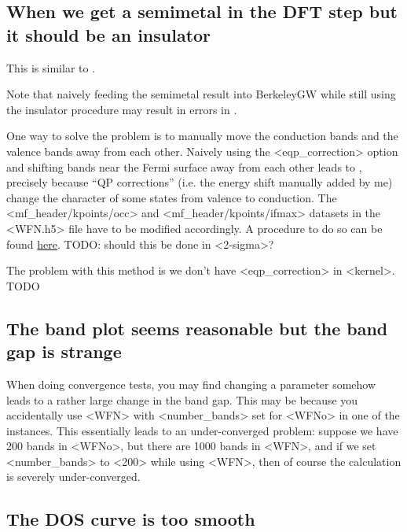 \documentclass[hyperref, a4paper, 12pt]{report}
\def\texttt#1{<#1>}%
\newcommand{\shortcode}[1]{\texttt{#1}}
\begin{document}
\subsection{When we get a semimetal in the DFT step but it should be an insulator}\label{sec:unexpected-metal}

This is similar to .

Note that naively feeding the semimetal result into BerkeleyGW 
while still using the insulator procedure
may result in errors in . 

One way to solve the problem is 
to manually move the conduction bands and the valence bands away from each other.
Naively using the \shortcode{eqp_correction} option 
and shifting bands near the Fermi surface away from each other 
leads to ,
precisely because 
``QP corrections'' (i.e. the energy shift manually added by me) 
change the character of some states from valence to conduction.
The \shortcode{mf_header/kpoints/occ} and \shortcode{mf_header/kpoints/ifmax} datasets 
in the \shortcode{WFN.h5} file 
have to be modified accordingly.
A procedure to do so can be found \href{./scripts/wfn-editing/move-occupation.jl}{here}.
TODO: should this be done in \shortcode{2-sigma}?

The problem with this method is we don't have \shortcode{eqp_correction} in \shortcode{kernel}. TODO 

\subsection{The band plot seems reasonable but the band gap is strange}

When doing convergence tests, 
you may find changing a parameter 
somehow leads to a rather large change in the band gap. 
This may be because you accidentally use \shortcode{WFN} 
with \shortcode{number_bands} set for \shortcode{WFNo} 
in one of the instances. 
This essentially leads to an under-converged problem: 
suppose we have 200 bands in \shortcode{WFNo},
but there are 1000 bands in \shortcode{WFN}, 
and if we set \shortcode{number_bands} to \shortcode{200} 
while using \shortcode{WFN}, 
then of course the calculation is severely under-converged.

\subsection{The DOS curve is too smooth}
\end{document}
